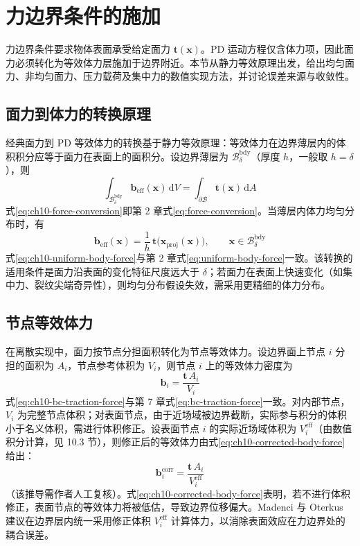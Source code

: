 \section{力边界条件的施加}

力边界条件要求物体表面承受给定面力 $\mathbf{t}(\mathbf{x})$。PD 运动方程仅含体力项，因此面力必须转化为等效体力层施加于边界附近。本节从静力等效原理出发，给出均匀面力、非均匀面力、压力载荷及集中力的数值实现方法，并讨论误差来源与收敛性。

\subsection{面力到体力的转换原理}

经典面力到 PD 等效体力的转换基于静力等效原理：等效体力在边界薄层内的体积积分应等于面力在表面上的面积分。设边界薄层为 $\mathcal{B}_{\delta}^{\text{bdy}}$（厚度 $h$，一般取 $h=\delta$），则
\begin{equation}
\int_{\mathcal{B}_{\delta}^{\text{bdy}}} \mathbf{b}_{\text{eff}}(\mathbf{x})\, \mathrm{d}V = \int_{\partial\mathcal{B}} \mathbf{t}(\mathbf{x})\, \mathrm{d}A
\label{eq:ch10-force-conversion}
\end{equation}
式\eqref{eq:ch10-force-conversion}即第 2 章式\eqref{eq:force-conversion}。当薄层内体力均匀分布时，有
\begin{equation}
\mathbf{b}_{\text{eff}}(\mathbf{x}) = \frac{1}{h}\,\mathbf{t}\bigl(\mathbf{x}_{\text{proj}}(\mathbf{x})\bigr), \qquad \mathbf{x}\in\mathcal{B}_{\delta}^{\text{bdy}}
\label{eq:ch10-uniform-body-force}
\end{equation}
式\eqref{eq:ch10-uniform-body-force}与第 2 章式\eqref{eq:uniform-body-force}一致。该转换的适用条件是面力沿表面的变化特征尺度远大于 $\delta$；若面力在表面上快速变化（如集中力、裂纹尖端奇异性），则均匀分布假设失效，需采用更精细的体力分布。

\subsection{节点等效体力}

在离散实现中，面力按节点分担面积转化为节点等效体力。设边界面上节点 $i$ 分担的面积为 $A_{i}$，节点参考体积为 $V_{i}$，则节点 $i$ 上的等效体力密度为
\begin{equation}
\mathbf{b}_{i} = \frac{\mathbf{t}\,A_{i}}{V_{i}}
\label{eq:ch10-bc-traction-force}
\end{equation}
式\eqref{eq:ch10-bc-traction-force}与第 7 章式\eqref{eq:bc-traction-force}一致。对内部节点，$V_{i}$ 为完整节点体积；对表面节点，由于近场域被边界截断，实际参与积分的体积小于名义体积，需进行体积修正。设表面节点 $i$ 的实际近场域体积为 $V_{i}^{\text{eff}}$（由数值积分计算，见 10.3 节），则修正后的等效体力由式\eqref{eq:ch10-corrected-body-force}给出：
\begin{equation}
\mathbf{b}_{i}^{\text{corr}} = \frac{\mathbf{t}\,A_{i}}{V_{i}^{\text{eff}}}
\label{eq:ch10-corrected-body-force}
\end{equation}
（该推导需作者人工复核）。式\eqref{eq:ch10-corrected-body-force}表明，若不进行体积修正，表面节点的等效体力将被低估，导致边界位移偏大。Madenci 与 Oterkus \cite{MadenciOterkus2014} 建议在边界层内统一采用修正体积 $V_{i}^{\text{eff}}$ 计算体力，以消除表面效应在力边界处的耦合误差。

